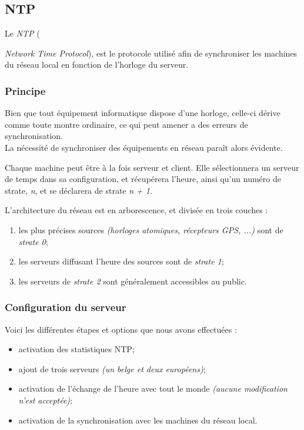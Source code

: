 \subsection{NTP}
\label{subsec:ntp}

Le \textit{NTP} ({\emph{Network Time Protocol}), est le protocole utilisé afin
de synchroniser les machines du réseau local en fonction de l'horloge du
serveur.

\subsubsection{Principe}
\label{subsubsec:principe}

Bien que tout équipement informatique dispose d'une horloge, celle-ci
dérive comme toute montre ordinaire, ce qui peut amener a des erreurs de
synchronisation. \\
La nécessité de synchroniser des équipements en réseau paraît alors évidente.

Chaque machine peut être à la fois serveur et client.
Elle sélectionnera un serveur de temps dans sa configuration, et récupérera
l'heure, ainsi qu'un numéro de strate, \emph{n}, et se déclarera
de strate \emph{n + 1}.

L'architecture du réseau est en arborescence, et divisée en trois couches :

\begin{enumerate}
    \item les plus précises sources \textit{(horloges atomiques,
        récepteurs GPS, ...)} sont de \emph{strate 0};

    \item les serveurs diffusant l'heure des sources sont de \emph{strate 1};

    \item les serveurs de \emph{strate 2} sont généralement accessibles au public.
\end{enumerate}

\subsubsection{Configuration du serveur}
\label{subsubsec:configuration-serveur}

Voici les différentes étapes et options que nous avons effectuées :

\begin{itemize}
    \item activation des statistiques NTP;
    \item ajout de trois serveurs \emph{(un belge et deux européens)};
    \item activation de l'échange de l'heure avec tout le monde \emph{(aucune
modification n'est acceptée)};
    \item activation de la synchronisation avec les machines du réseau local.
\end{itemize}


}
